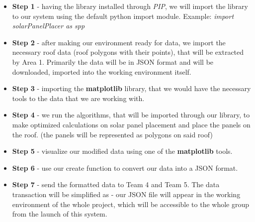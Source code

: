 \documentclass[a4paper,12pt,fleqn]{article}
\begin{document}
\begin{itemize}
    \item \textbf{Step 1} - having the library installed through \textit{PIP}, we will import the library to our system using the default python import module. Example: \textit{import solarPanelPlacer as spp}
    \item \textbf{Step 2} - after making our environment ready for data, we import the necessary roof data (roof polygons with their points), that will be extracted by Area 1. Primarily the data will be in JSON format and will be downloaded, imported into the working environment itself.
    \item \textbf{Step 3} - importing the \textbf{matplotlib} library, that we would have the necessary tools to the data that we are working with.
    \item \textbf{Step 4} - we run the algorithms, that will be imported through our library, to make optimized calculations on solar panel placement and place the panels on the roof. (the panels will be represented as polygons on said roof)
    \item \textbf{Step 5} - visualize our modified data using one of the \textbf{matplotlib} tools.
    \item \textbf{Step 6} - use our create function to convert our data into a JSON format.
    \item \textbf{Step 7} - send the formatted data to Team 4 and Team 5. The data transaction will be simplified as - our JSON file will appear in the working environment of the whole project, which will be accessible to the whole group from the launch of this system.
\end{itemize}
\end{document}
